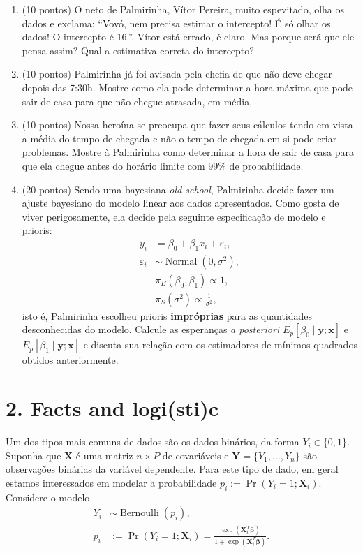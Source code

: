 \documentclass[a4paper,10pt, notitlepage]{report}
\newcommand{\pr}{\operatorname{Pr}} %
\newif\ifanswers
\begin{document}
\begin{enumerate}[label=\alph*)]
 \item (10 pontos) O neto de Palmirinha, Vítor Pereira, muito espevitado, olha os dados e exclama: ``Vovó, nem precisa estimar o intercepto! É só olhar os dados! O intercepto é 16.''.
  Vítor está errado, é claro.
  Mas porque será que ele pensa assim?
  Qual a estimativa correta do intercepto?
 \item (10 pontos) Palmirinha já foi avisada pela chefia de que não deve chegar depois das 7:30h.
 Mostre como ela pode determinar a hora máxima que pode sair de casa para que não chegue atrasada, em média.
 \item (10 pontos) Nossa heroína se preocupa que fazer seus cálculos tendo em vista a média do tempo de chegada e não o tempo de chegada em si pode criar problemas.
 Mostre à Palmirinha como determinar a hora de sair de casa para que ela chegue antes do horário limite com 99\%  de probabilidade.
 \item (20 pontos) Sendo uma bayesiana \textit{old school}, Palmirinha decide fazer um ajuste bayesiano do modelo linear aos dados apresentados.
 Como gosta de viver perigosamente, ela decide pela seguinte especificação de modelo e prioris:
 \begin{align*}
     y_i &= \beta_0 + \beta_1 x_i + \varepsilon_i,\\
     \varepsilon_i & \sim \operatorname{Normal}(0, \sigma^2),\\
     & \pi_B(\beta_0, \beta_1) \propto 1,\\
     & \pi_S(\sigma^2) \propto \frac{1}{\sigma^2},
 \end{align*}
 isto é, Palmirinha escolheu prioris \textbf{impróprias} para as quantidades desconhecidas do modelo.
 Calcule as esperanças \textit{a posteriori} $E_p[\beta_0 \mid \boldsymbol{y}; \boldsymbol{x}]$ e $E_p[\beta_1 \mid \boldsymbol{y}; \boldsymbol{x}]$ e discuta sua relação com os estimadores de mínimos quadrados obtidos anteriormente.
\end{enumerate}
\ifanswers

\fi

\section*{2.  Facts and logi(sti)c } 
Um dos tipos mais comuns de dados são os dados binários, da forma $Y_i \in \{0, 1\}$.
Suponha que $\boldsymbol{X}$ é uma matriz $n \times P$ de covariáveis e $\boldsymbol{Y} = \{Y_1, \ldots, Y_n\}$ são observações binárias da variável dependente.
Para este tipo de dado, em geral estamos interessados em modelar a probabilidade $p_i := \pr(Y_i = 1; \boldsymbol{X}_i)$.
Considere o modelo
\begin{align*}
    Y_i &\sim \operatorname{Bernoulli}(p_i),\\
    p_i &:= \pr(Y_i = 1; \boldsymbol{X}_i) = \frac{\exp\left(\boldsymbol{X}_i^T\boldsymbol{\beta}\right)}{1 + \exp\left(\boldsymbol{X}_i^T\boldsymbol{\beta}\right)}.
\end{align*}
\end{document}
